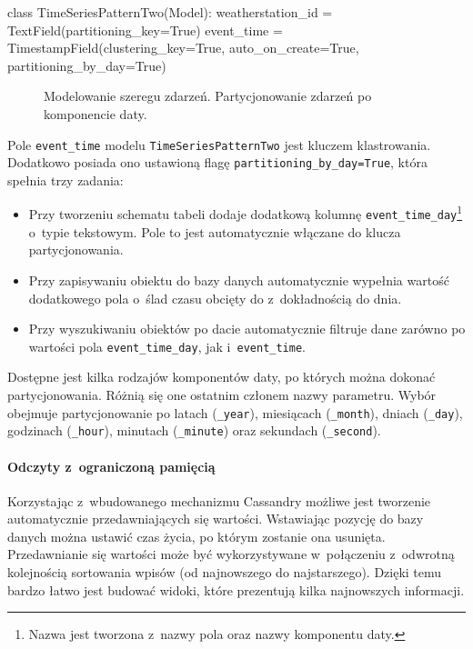 \begin{verbbox}
class TimeSeriesPatternTwo(Model):
    weatherstation_id = TextField(partitioning_key=True)
    event_time = TimestampField(clustering_key=True, 
                                auto_on_create=True, 
                                partitioning_by_day=True)
\end{verbbox}

\begin{figure}[ht!]
	\centering
	\theverbbox
	\caption{Modelowanie szeregu zdarzeń. Partycjonowanie zdarzeń po komponencie daty.}
	\label{lst:time_series_modeling_two}
\end{figure}

Pole \verb+event_time+ modelu \verb+TimeSeriesPatternTwo+ jest kluczem klastrowania. Dodatkowo posiada ono ustawioną flagę \verb+partitioning_by_day=True+, która spełnia trzy zadania:

\begin{itemize}
	\item Przy tworzeniu schematu tabeli dodaje dodatkową kolumnę \verb+event_time_day+\footnote{Nazwa jest tworzona z~nazwy pola oraz nazwy komponentu daty.} o~typie tekstowym. Pole to jest automatycznie włączane do klucza partycjonowania.
	\item Przy zapisywaniu obiektu do bazy danych automatycznie wypełnia wartość dodatkowego pola o~ślad czasu obcięty do z~dokładnością do dnia.
	\item Przy wyszukiwaniu obiektów po dacie automatycznie filtruje dane zarówno po wartości pola \verb+event_time_day+, jak i~\verb+event_time+.
\end{itemize}

Dostępne jest kilka rodzajów komponentów daty, po których można dokonać partycjonowania. Różnią się one ostatnim członem nazwy parametru. Wybór obejmuje partycjonowanie po latach (\verb+_year+), miesiącach (\verb+_month+), dniach (\verb+_day+), godzinach (\verb+_hour+), minutach (\verb+_minute+) oraz sekundach (\verb+_second+).

\paragraph{Odczyty z~ograniczoną pamięcią}

Korzystając z~wbudowanego mechanizmu Cassandry możliwe jest tworzenie automatycznie przedawniających się wartości. Wstawiając pozycję do bazy danych można ustawić czas życia, po którym zostanie ona usunięta. Przedawnianie się wartości może być wykorzystywane w~połączeniu z~odwrotną kolejnością sortowania wpisów (od najnowszego do najstarszego). Dzięki temu bardzo łatwo jest budować widoki, które prezentują kilka najnowszych informacji.

